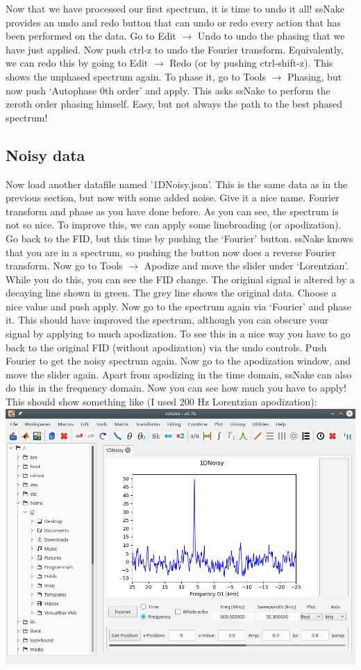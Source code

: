\documentclass[11pt,a4paper]{article}
\begin{document}
Now that we have processed our first spectrum, it is time to undo it all! ssNake provides an undo and redo button that can undo or redo every action that has been performed on the data. Go to Edit $\rightarrow$ Undo to undo the phasing that we have just applied. Now push ctrl-z to undo the Fourier transform. Equivalently, we can redo this by going to Edit $\rightarrow$ Redo (or by pushing ctrl-shift-z). This shows the unphased spectrum again. To phase it, go to Tools $\rightarrow$ Phasing, but now push `Autophase 0th order' and apply. This asks ssNake to perform the zeroth order phasing himself. Easy, but not always the path to the best phased spectrum! 

\subsection{Noisy data}
Now load another datafile named '1DNoisy.json'. This is the same data as in the previous section,
but now with some added noise. Give it a nice name. Fourier transform and phase as you have done
before. As you can see, the spectrum is not so nice. To improve this, we can apply some linebroading
(or apodization). Go back to the FID, but this time by pushing the `Fourier' button. ssNake knows
that you are in a spectrum, so pushing the button now does a reverse Fourier transform. Now go to
Tools $\rightarrow$ Apodize and move the slider under `Lorentzian'. While you do this, you can see
the FID change. The original signal is altered by a decaying line shown in green. The grey line
shows the original data. Choose a nice value and push apply. Now go to the spectrum again via
`Fourier' and phase it. This should have improved the spectrum, although you can obscure your signal
by applying to much apodization. To see this in a nice way you have to go back to the original FID
(without apodization) via the undo controls. Push Fourier to get the noisy spectrum again. Now go to
the apodization window, and move the slider again. Apart from apodizing in the time domain, ssNake
can also do this in the frequency domain. Now you can see how much you have to apply! This should
show something like (I used 200 Hz Lorentzian apodization):\\
\includegraphics[width=\linewidth]{Images/1DnoisyProcessed.png}
\end{document}
